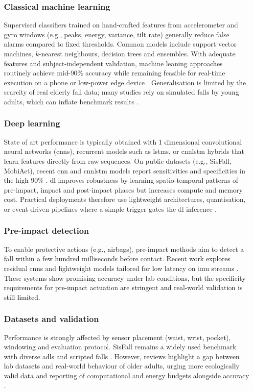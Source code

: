 \subsubsection{Classical machine learning}
Supervised classifiers trained on hand-crafted features from accelerometer and gyro windows (e.g., peaks, energy, variance, tilt rate) generally reduce false alarms compared to fixed thresholds. Common models include support vector machines, $k$-nearest neighbours, decision trees and ensembles. With adequate features and subject-independent validation, machine leaning approaches routinely achieve mid-90\% accuracy while remaining feasible for real-time execution on a phone or low-power edge device \cite{Stampfler2022_PervasiveAppsReview}. Generalisation is limited by the scarcity of real elderly fall data; many studies rely on simulated falls by young adults, which can inflate benchmark results \cite{Casilari2022_DatasetComparisons}.

\subsubsection{Deep learning}
State of art performance is typically obtained with 1 dimensional convolutional neural networks (\gls{cnn}s), recurrent models such as \gls{lstm}s, or \gls{cnnlstm} hybrids that learn features directly from raw sequences. On public datasets (e.g., SisFall, MobiAct), recent \gls{cnn} and \gls{cnnlstm} models report sensitivities and specificities in the high 90\% \cite{Zhang2024_JMIR,Garcia2022_Neurocomputing}. \gls{dl} improves robustness by learning spatio-temporal patterns of pre-impact, impact and post-impact phases but increases compute and memory cost. Practical deployments therefore use lightweight architectures, quantisation, or event-driven pipelines where a simple trigger gates the \gls{dl} inference \cite{Hu2025_BSPC}.

\subsubsection{Pre-impact detection}
To enable protective actions (e.g., airbags), pre-impact methods aim to detect a fall within a few hundred milliseconds before contact. Recent work explores residual \gls{cnn}s and lightweight models tailored for low latency on \gls{imu} streams \cite{FDSNeXt2022_IASC,TinyFallNet2023_Sensors}. These systems show promising accuracy under lab conditions, but the specificity requirements for pre-impact actuation are stringent and real-world validation is still limited.

\subsubsection{Datasets and validation}
Performance is strongly affected by sensor placement (waist, wrist, pocket), windowing and evaluation protocol. SisFall remains a widely used benchmark with diverse \gls{adl}s and scripted falls \cite{Sucerquia2017_SisFall}. However, reviews highlight a gap between lab datasets and real-world behaviour of older adults, urging more ecologically valid data and reporting of computational and energy budgets alongside accuracy \cite{Casilari2022_DatasetComparisons,Stampfler2022_PervasiveAppsReview}.